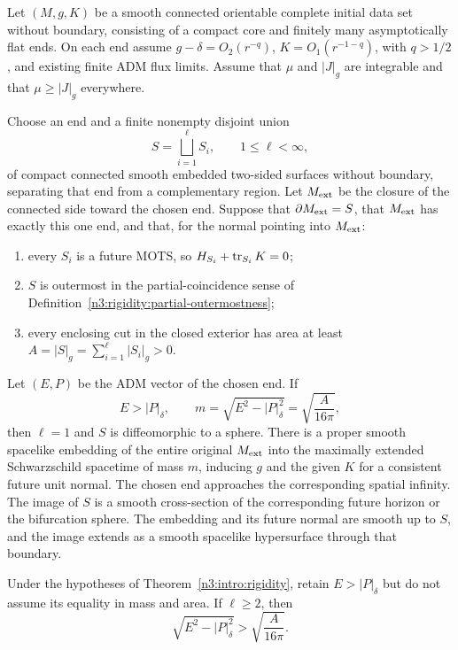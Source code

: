 \begin{theorem}
\label{n3:intro:rigidity}
Let $(M,g,K)$ be a smooth connected orientable complete initial data
set without boundary, consisting of a compact core and finitely many
asymptotically flat ends. On each end assume
$g-\delta=O_2(r^{-q})$, $K=O_1(r^{-1-q})$, with $q>1/2$, and existing
finite ADM flux limits. Assume that $\mu$ and $|J|_g$ are integrable
and that $\mu\geq|J|_g$ everywhere.

Choose an end and a finite nonempty disjoint union
\[
S=\bigsqcup_{i=1}^{\ell}S_i,\qquad 1\leq\ell<\infty,
\]
of compact connected smooth embedded two-sided surfaces without boundary,
separating
that end from a complementary region. Let $M_{\mathrm{ext}}$ be the closure of
the connected side toward the chosen end. Suppose that
$\partial M_{\mathrm{ext}}=S$, that $M_{\mathrm{ext}}$ has exactly this one end, and that,
for the normal pointing into $M_{\mathrm{ext}}$:
\begin{enumerate}[label=\textup{(\roman*)}]
\item every $S_i$ is a future MOTS, so $H_{S_i}+\operatorname{tr}_{S_i}K=0$;
\item $S$ is outermost in the partial-coincidence sense of
Definition~\ref{n3:rigidity:partial-outermostness};
\item every enclosing cut in the closed exterior has area at least
$A=|S|_g=\sum_{i=1}^{\ell}|S_i|_g>0$.
\end{enumerate}
Let $(E,P)$ be the ADM vector of the chosen end. If
\begin{equation}
\label{n3:intro:equality}
E>|P|_\delta,\qquad
m=\sqrt{E^2-|P|_\delta^2}=\sqrt{\frac{A}{16\pi}},
\end{equation}
then $\ell=1$ and $S$ is diffeomorphic to a sphere. There is a proper
smooth spacelike embedding of the entire original $M_{\mathrm{ext}}$ into the
maximally extended Schwarzschild spacetime of mass $m$, inducing $g$
and the given $K$ for a consistent future unit normal. The chosen end
approaches the corresponding spatial infinity. The image of $S$ is a
smooth cross-section of the corresponding future horizon or the
bifurcation sphere. The embedding and its future normal are smooth
up to $S$, and the image extends as a smooth spacelike hypersurface
through that boundary.
\end{theorem}

\begin{corollary}
\label{n3:rigidity:finite-strictness}
Under the hypotheses of Theorem~\ref{n3:intro:rigidity}, retain
$E>|P|_\delta$ but do not assume its equality in mass and area.
If $\ell\geq2$, then
\[
\sqrt{E^2-|P|_\delta^2}>\sqrt{\frac{A}{16\pi}}.
\]
\end{corollary}

